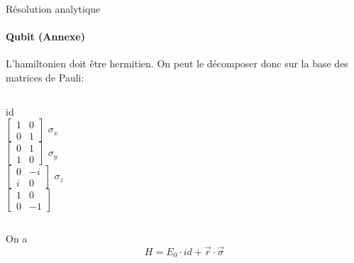 \documentclass[11pt]{beamer}
\begin{document}
\begin{frame}{Résolution analytique}
\framesubtitle{Qubit (Annexe)}
L'hamiltonien doit être hermitien. On peut le décomposer donc sur la base des matrices de Pauli:\vspace{1em}
\begin{columns}
\centering
id\\\vspace{1em}
$\begin{bmatrix}1&0\\0&1\end{bmatrix}$
\centering
$\sigma_x$\\\vspace{1em}
$\begin{bmatrix}0&1\\1&0\end{bmatrix}$
\centering
$\sigma_y$\\\vspace{1em}
$\begin{bmatrix}0&-i\\i&0\end{bmatrix}$
\centering
$\sigma_z$\\\vspace{1em}
$\begin{bmatrix}1&0\\0&-1\end{bmatrix}$
\end{columns}\vspace{1em}
On a \[H=E_0\cdot id+\vec{r}\cdot\vec{\sigma}\]
\end{frame}
\end{document}

